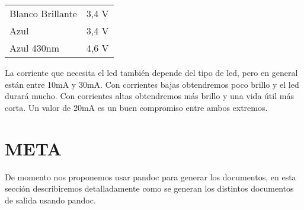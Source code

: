 \begin{longtable}[c]{@{}lc@{}}
\begin{minipage}[t]{0.31\columnwidth}\raggedright\strut
Blanco Brillante
\strut\end{minipage} &
\begin{minipage}[t]{0.12\columnwidth}\centering\strut
3,4 V
\strut\end{minipage}\tabularnewline
\begin{minipage}[t]{0.31\columnwidth}\raggedright\strut
Azul
\strut\end{minipage} &
\begin{minipage}[t]{0.12\columnwidth}\centering\strut
3,4 V
\strut\end{minipage}\tabularnewline
\begin{minipage}[t]{0.31\columnwidth}\raggedright\strut
Azul 430nm
\strut\end{minipage} &
\begin{minipage}[t]{0.12\columnwidth}\centering\strut
4,6 V
\strut\end{minipage}\tabularnewline
\bottomrule
\end{longtable}

La corriente que necesita el led también depende del tipo de led, pero
en general están entre 10mA y 30mA. Con corrientes bajas obtendremos
poco brillo y el led durará mucho. Con corrientes altas obtendremos más
brillo y una vida útil más corta. Un valor de 20mA es un buen compromiso
entre ambos extremos.

\section{META}\label{meta}

De momento nos proponemos usar pandoc para generar los documentos, en
esta sección describiremos detalladamente como se generan los distintos
documentos de salida usando pandoc.
